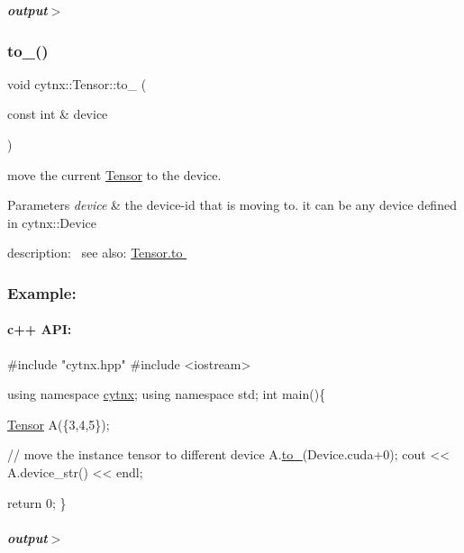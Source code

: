 \begin{DoxyCodeInclude}
\end{DoxyCodeInclude}
 \subparagraph*{output$>$}


\begin{DoxyVerbInclude}
\end{DoxyVerbInclude}
 \mbox{\label{classcytnx_1_1Tensor_a114a31fbb8bf4a90f150b6a67e42183a}} 
\subsubsection{\texorpdfstring{to\+\_\+()}{to\_()}}
{\footnotesize\ttfamily void cytnx\+::\+Tensor\+::to\+\_\+ (\begin{DoxyParamCaption}\item[{const int \&}]{device }\end{DoxyParamCaption})\hspace{0.3cm}{\ttfamily [inline]}}



move the current \hyperlink{classcytnx_1_1Tensor}{Tensor} to the device. 


\begin{DoxyParams}{Parameters}
{\em device} & the device-\/id that is moving to. it can be any device defined in cytnx\+::\+Device\\
\hline
\end{DoxyParams}
description\+:~\newline
 see also\+: \hyperlink{classcytnx_1_1Tensor_acf7f697a9434f9bc98a7d00a555ee982}{Tensor.\+to }~\newline
 \subsubsection*{Example\+:}

\paragraph*{c++ A\+PI\+:}


\begin{DoxyCodeInclude}
\textcolor{preprocessor}{#include "cytnx.hpp"}
\textcolor{preprocessor}{#include <iostream>}


\textcolor{keyword}{using namespace }\hyperlink{namespacecytnx}{cytnx};
\textcolor{keyword}{using namespace }std;
\textcolor{keywordtype}{int} main()\{

    \hyperlink{classcytnx_1_1Tensor}{Tensor} A(\{3,4,5\});

    \textcolor{comment}{// move the instance tensor to different device}
    A.\hyperlink{classcytnx_1_1Tensor_a114a31fbb8bf4a90f150b6a67e42183a}{to\_}(Device.cuda+0);
    cout << A.device\_str() << endl;

    \textcolor{keywordflow}{return} 0;
\}
\end{DoxyCodeInclude}
 \subparagraph*{output$>$}


